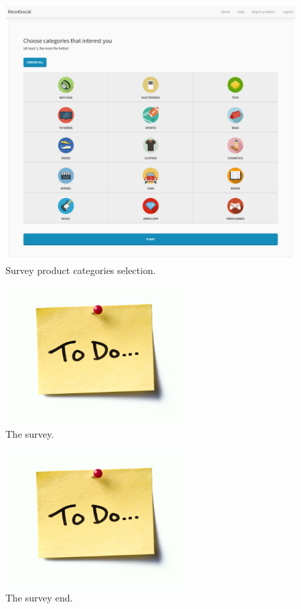 \documentclass[12pt]{report}
\begin{document}
\begin{figure}[!t]
\centering
\includegraphics[width=\textwidth]{reco4_survey-intro-2.png} 
\caption[Survey product categories selection.]{Survey product categories selection.}
\label{fig.survey.intro-2}
\end{figure}

\begin{figure}[!t]
\centering
\includegraphics[width=7cm]{todo.jpg} 
\caption[The survey.]{The survey.}
\label{fig.survey}
\end{figure}

\begin{figure}[!t]
\centering
\includegraphics[width=7cm]{todo.jpg} 
\caption[The survey end.]{The survey end.}
\label{fig.survey.end}
\end{figure}
\end{document}
